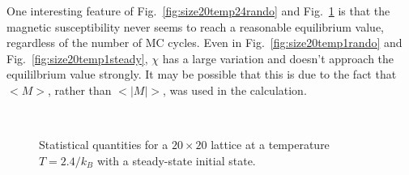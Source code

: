 \documentclass[12pt]{article}
\numberwithin{equation}{section}
\begin{document}
\par One interesting feature of Fig.~\ref{fig:size20temp24rando} and Fig.~\ref{fig:size20temp24steady} is that the magnetic susceptibility never seems to reach a reasonable equilibrium value, regardless of the number of MC cycles.  Even in Fig.~\ref{fig:size20temp1rando} and Fig.~\ref{fig:size20temp1steady}, $\chi$ has a large variation and doesn't approach the equililbrium value strongly.  It may be possible that this is due to the fact that $<M>$, rather than $<|M|>$, was used in the calculation.

\begin{figure}[h]
\begin{center}
 \\
\caption{Statistical quantities for a $20\times20$ lattice at a temperature $T=2.4/k_{B}$ with a steady-state initial state.}
\label{fig:size20temp24steady}
\end{center}
\end{figure}
\end{document}

